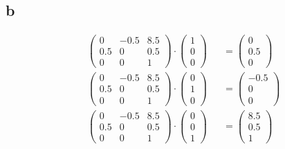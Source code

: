 \documentclass[ngerman, a4paper, 12pt]{article}
\begin{document}
\subsection{b}
\[
    \begin{aligned}
         & \begin{pmatrix}
               0   & -0.5 & 8.5 \\
               0.5 & 0    & 0.5 \\
               0   & 0    & 1
           \end{pmatrix}
        \cdot
        \begin{pmatrix}
            1 \\
            0 \\
            0
        \end{pmatrix}
         && =
        \begin{pmatrix}
            0   \\
            0.5 \\
            0
        \end{pmatrix}
        \\
         & \begin{pmatrix}
               0   & -0.5 & 8.5 \\
               0.5 & 0    & 0.5 \\
               0   & 0    & 1
           \end{pmatrix}
        \cdot
        \begin{pmatrix}
            0 \\
            1 \\
            0
        \end{pmatrix}
         && =
        \begin{pmatrix}
            -0.5 \\
            0    \\
            0
        \end{pmatrix}
        \\
         & \begin{pmatrix}
               0   & -0.5 & 8.5 \\
               0.5 & 0    & 0.5 \\
               0   & 0    & 1
           \end{pmatrix}
        \cdot
        \begin{pmatrix}
            0 \\
            0 \\
            1
        \end{pmatrix}
         && =
        \begin{pmatrix}
            8.5 \\
            0.5 \\
            1
        \end{pmatrix}
    \end{aligned}
\]
\end{document}
